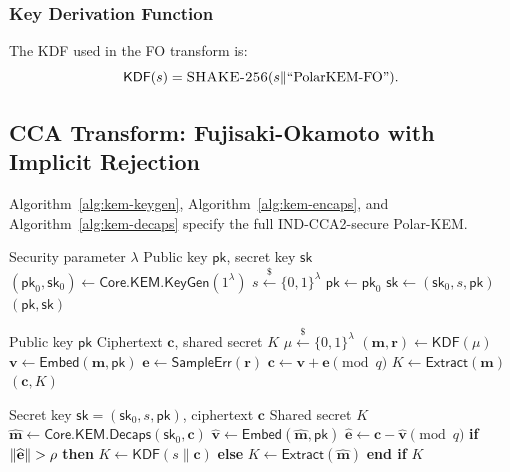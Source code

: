 \documentclass[11pt,a4paper]{article}
\newcommand{\polarKem}{\textsf{Polar-KEM}\xspace}
\newcommand{\CoreKEM}{\textsf{Core.KEM}\xspace}
\newcommand{\FO}{\textsf{FO}\xspace}
\newcommand{\KDF}{\textsf{KDF}\xspace}
\newcommand{\Extract}{\textsf{Extract}\xspace}
\newcommand{\INDCCA}{\textsf{IND-CCA2}\xspace}
\newcommand{\bit}{\{0,1\}}
\newcommand{\sample}{\xleftarrow{\$}}
\newcommand{\pk}{\mathsf{pk}}
\newcommand{\sk}{\mathsf{sk}}
\DeclarePairedDelimiter{\norm}{\lVert}{\rVert}
\begin{document}
\subsubsection{Key Derivation Function}

The KDF used in the \FO transform is:
\[
\KDF(s) = \textsc{SHAKE-256}(s \| \text{``PolarKEM-FO''}).
\]

\subsection{CCA Transform: Fujisaki-Okamoto with Implicit Rejection}\label{sec:cca-fo}

Algorithm~\ref{alg:kem-keygen}, Algorithm~\ref{alg:kem-encaps}, and Algorithm~\ref{alg:kem-decaps} specify the full \INDCCA-secure \polarKem.

\begin{algorithm}[H]
\caption{$\polarKem.\mathsf{KeyGen}(1^\lambda)$}
\label{alg:kem-keygen}
\begin{algorithmic}[1]
\REQUIRE Security parameter $\lambda$
\ENSURE Public key $\pk$, secret key $\sk$
\STATE $(\pk_0, \sk_0) \gets \CoreKEM.\mathsf{KeyGen}(1^\lambda)$
\STATE $s \sample \bit^{\lambda}$ 
\STATE $\pk \gets \pk_0$
\STATE $\sk \gets (\sk_0, s, \pk)$
\RETURN $(\pk, \sk)$
\end{algorithmic}
\end{algorithm}

\begin{algorithm}[H]
\caption{$\polarKem.\mathsf{Encaps}(\pk)$}
\label{alg:kem-encaps}
\begin{algorithmic}[1]
\REQUIRE Public key $\pk$
\ENSURE Ciphertext $\mathbf{c}$, shared secret $K$
\STATE $\mu \sample \bit^{\lambda}$ 
\STATE $(\mathbf{m}, \mathbf{r}) \gets \KDF(\mu)$ 
\STATE $\mathbf{v} \gets \mathsf{Embed}(\mathbf{m}, \pk)$
\STATE $\mathbf{e} \gets \mathsf{SampleErr}(\mathbf{r})$
\STATE $\mathbf{c} \gets \mathbf{v} + \mathbf{e} \pmod{q}$
\STATE $K \gets \Extract(\mathbf{m})$
\RETURN $(\mathbf{c}, K)$
\end{algorithmic}
\end{algorithm}

\begin{algorithm}[H]
\caption{$\polarKem.\mathsf{Decaps}(\sk, \mathbf{c})$}
\label{alg:kem-decaps}
\begin{algorithmic}[1]
\REQUIRE Secret key $\sk = (\sk_0, s, \pk)$, ciphertext $\mathbf{c}$
\ENSURE Shared secret $K$
\STATE $\widehat{\mathbf{m}} \gets \CoreKEM.\mathsf{Decaps}(\sk_0, \mathbf{c})$ 
\STATE $\widehat{\mathbf{v}} \gets \mathsf{Embed}(\widehat{\mathbf{m}}, \pk)$
\STATE $\widehat{\mathbf{e}} \gets \mathbf{c} - \widehat{\mathbf{v}} \pmod{q}$
\STATE \textbf{if} $\norm{\widehat{\mathbf{e}}} > \rho$ \textbf{then} 
    \STATE \quad $K \gets \KDF(s \| \mathbf{c})$ 
\STATE \textbf{else}
    \STATE \quad $K \gets \Extract(\widehat{\mathbf{m}})$
\STATE \textbf{end if}
\RETURN $K$
\end{algorithmic}
\end{algorithm}
\end{document}

